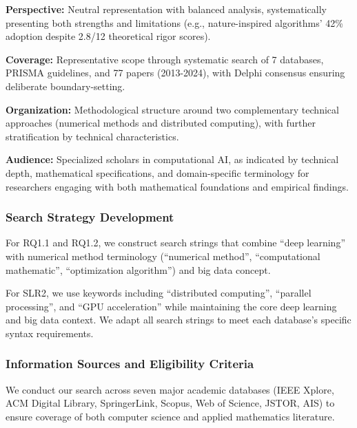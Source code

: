 \documentclass[acmsmall]{acmart}
\begin{document}
\textbf{Perspective:} Neutral representation with balanced analysis, systematically presenting both strengths and limitations (e.g., nature-inspired algorithms' 42\% adoption despite 2.8/12 theoretical rigor scores).

\textbf{Coverage:} Representative scope through systematic search of 7 databases, PRISMA guidelines, and 77 papers (2013-2024), with Delphi consensus ensuring deliberate boundary-setting.

\textbf{Organization:} Methodological structure around two complementary technical approaches (numerical methods and distributed computing), with further stratification by technical characteristics.

\textbf{Audience:} Specialized scholars in computational AI, as indicated by technical depth, mathematical specifications, and domain-specific terminology for researchers engaging with both mathematical foundations and empirical findings.



\subsubsection{Search Strategy Development}\label{subsubsec:phase-1-planning-and-protocol-development:search-strategy-development}
For RQ1.1 and RQ1.2, we construct search strings that combine ``deep learning'' with numerical method terminology (``numerical method'', ``computational mathematic'', ``optimization algorithm'') and big data concept.

For SLR2, we use keywords including ``distributed computing'', ``parallel processing'', and ``GPU acceleration'' while maintaining the core deep learning and big data context. We adapt all search strings to meet each database's specific syntax requirements.

\subsubsection{Information Sources and Eligibility Criteria}\label{subsubsec:phase-1-planning-and-protocol-development:information-sources-and-eligibility-criteria}
We conduct our search across seven major academic databases (IEEE Xplore, ACM Digital Library, SpringerLink, Scopus, Web of Science, JSTOR, AIS) to ensure coverage of both computer science and applied mathematics literature.
\end{document}
